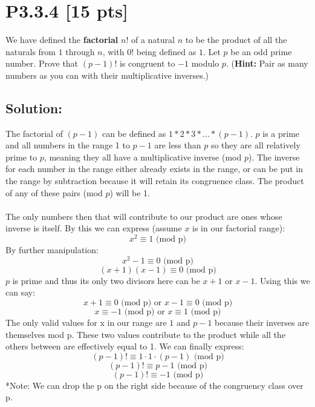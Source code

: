\documentclass[12pt]{article}
\begin{document}
\newpage
\section*{\textbf{P3.3.4} [15 pts]}
We have defined the \textbf{factorial} $n!$ of a natural $n$ to be the product of all the naturals from $1$ through $n$, with $0!$ being defined as $1$. Let $p$ be an odd prime number. Prove that $(p - 1)!$ is congruent to $-1$ modulo $p$. (\textbf{Hint:} Pair as many numbers as you can with their multiplicative inverses.)

\subsection*{\textbf{Solution:}}

The factorial of $(p-1)$ can be defined as $1*2*3*\ldots*(p-1)$. $p$ is a prime and all numbers in the range 1 to $p-1$ are less than $p$ so they are all relatively prime to $p$, meaning they all have a multiplicative inverse (mod $p$). The inverse for each number in the range either already exists in the range, or can be put in the range by subtraction because it will retain its congruence class. The product of any of these pairs (mod $p$) will be 1.\\\\

The only numbers then that will contribute to our product are ones whose inverse is itself. By this we can express (assume $x$ is in our factorial range):
\[ x^2 \equiv 1 \text{ (mod p)} \]
By further manipulation:
\[ x^2 - 1 \equiv 0 \text{ (mod p)} \]
\[ (x+1)(x-1) \equiv 0 \text{ (mod p)} \]
$p$ is prime and thus its only two divisors here can be $x+1$ or $x-1$. Using this we can say:
\[ x+1 \equiv 0 \text{ (mod p) or  } x-1 \equiv 0 \text{ (mod p)} \]
\[ x \equiv -1 \text{ (mod p) or  } x \equiv 1 \text{ (mod p)} \]
The only valid values for x in our range are $1$ and $p-1$ because their inverses are themselves mod p. These two values contribute to the product while all the others between are effectively equal to 1. We can finally express:
\[ (p - 1)! \equiv 1 \cdot 1 \cdot (p - 1) \text{ (mod p)} \]
\[ (p - 1)! \equiv p - 1 \text{ (mod p)} \]
\[ (p - 1)! \equiv -1 \text{ (mod p)} \]
*Note: We can drop the p on the right side because of the congruency class over p.


\newpage
\end{document}
